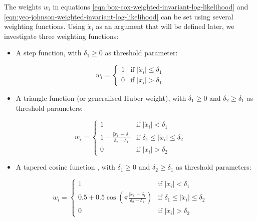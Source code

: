 \documentclass[preprint,12pt,authoryear]{elsarticle}
\begin{document}
The weights \(w_i\) in equations
\ref{eqn:box-cox-weighted-invariant-log-likelihood} and
\ref{eqn:yeo-johnson-weighted-invariant-log-likelihood} can be set using
several weighting functions. Using \(\dot{x}_i\) as an argument that
will be defined later, we investigate three weighting functions:

\begin{itemize}
\item
  A step function, with \(\delta_1 \geq 0\) as threshold parameter:
\end{itemize}

\begin{equation}
w_i =
\begin{cases}
1 & \text{if } \left| \dot{x}_i \right| \leq \delta_1\\
0 & \text{if } \left| \dot{x}_i \right| > \delta_1
\end{cases}
\end{equation}

\begin{itemize}
\item
  A triangle function (or generalised Huber weight), with
  \(\delta_1 \geq 0\) and \(\delta_2 \geq \delta_1\) as threshold
  parameters:
\end{itemize}

\begin{equation}
w_i =
\begin{cases}
1 & \text{if } \left| \dot{x}_i \right| < \delta_1\\
1 - \frac{\left| \dot{x}_i \right| - \delta_1}{\delta_2 - \delta_1} & \text{if } \delta_1 \leq \left| \dot{x}_i \right| \leq \delta_2 \\
0 & \text{if } \left| \dot{x}_i \right| > \delta_2
\end{cases}
\end{equation}

\begin{itemize}
\item
  A tapered cosine function \citep{Tukey1967-eb}, with \(\delta_1 \geq 0\)
  and \(\delta_2 \geq \delta_1\) as threshold parameters:
\end{itemize}

\begin{equation}
w_i =
\begin{cases}
1 & \text{if } \left| \dot{x}_i \right| < \delta_1\\
0.5 + 0.5 \cos\left(\pi \frac{\left| \dot{x}_i \right| - \delta_1}{\delta_2 - \delta_1} \right) & \text{if } \delta_1 \leq \left| \dot{x}_i \right| \leq \delta_2 \\
0 & \text{if } \left| \dot{x}_i \right| > \delta_2
\end{cases}
\end{equation}
\end{document}
